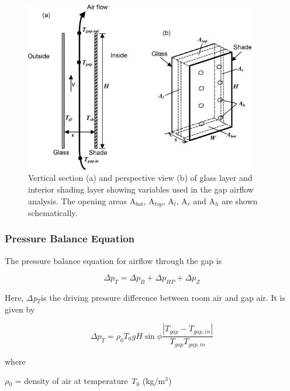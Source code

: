 \begin{figure}[hbtp] %
\centering
\includegraphics[width=0.9\textwidth, height=0.9\textheight, keepaspectratio=true]{media/image1670.png}
\caption{Vertical section (a) and perspective view (b) of glass layer and interior shading layer showing variables used in the gap airflow analysis. The opening areas A\(_{bot}\), A\(_{top}\), A\(_{l}\), A\(_{r}\) and A\(_{h}\) are shown schematically. \protect \label{fig:vertical-section-a-and-perspective-view-b-of}}
\end{figure}

\subsubsection{Pressure Balance Equation}\label{pressure-balance-equation}

The pressure balance equation for airflow through the gap is

\begin{equation}
\Delta {p_T} = \Delta {p_B} + \Delta {p_{HP}} + \Delta {p_Z}
\end{equation}

Here, \emph{Δp\(_{T}\)}is the driving pressure difference between room air and gap air. It is given by

\begin{equation}
\Delta {p_T} = {\rho_0}{T_0}gH\sin \phi \frac{{\left| {{T_{gap}} - {T_{gap,in}}} \right|}}{{{T_{gap}}{T_{gap,in}}}}
\end{equation}

where

\emph{$\rho$\(_{0}\)} = density of air at temperature \emph{T\(_{0}\)} (kg/m\(^{3}\))

